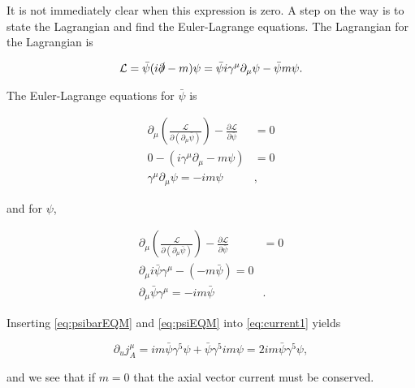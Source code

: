 \documentclass[11pt, a4paper]{amsart}
\begin{document}
It is not immediately clear when this expression is zero. A step on the way is to state the Lagrangian and find the Euler-Lagrange equations. The Lagrangian for the Lagrangian is

\begin{equation}
\mathcal{L} = \bar{\psi}(i \slashed{\partial} - m) \psi =  \bar{\psi}i\gamma^\mu \partial_\mu \psi - \bar{\psi}m\psi.
\end{equation}

The Euler-Lagrange equations for $\bar{\psi}$ is

\begin{align}
\partial_\mu \left(\frac{\mathcal{L}}{\partial (\partial_\mu \bar{\psi})} \right) - \frac{\partial \mathcal{L}}{\partial \bar{\psi}} &= 0 \\
0 - (i\gamma^\mu\partial_\mu - m \psi) &= 0	\\
\gamma^\mu\partial_\mu \psi = -im\psi& \label{eq:psibarEQM},
\end{align}

and for $\psi$,

\begin{align}
\partial_\mu \left(\frac{\mathcal{L}}{\partial (\partial_\mu \bar{\psi})} \right) - \frac{\partial \mathcal{L}}{\partial \bar{\psi}} &= 0 \\
\partial_\mu i\bar{\psi} \gamma^\mu - (-m\bar{\psi}) = 0 \\
\partial_\mu \bar{\psi} \gamma^\mu = - im\bar{\psi}& \label{eq:psiEQM}.
\end{align}

Inserting \autoref{eq:psibarEQM} and \autoref{eq:psiEQM} into \autoref{eq:current1} yields

\begin{equation}
\partial_u j^\mu_A = im\bar{\psi}\gamma^5\psi + \bar{\psi}\gamma^5 im \psi = 2im\bar{\psi}\gamma^5 \psi,
\end{equation}

and we see that if $m=0$ that the axial vector current  must be conserved.
\end{document}
